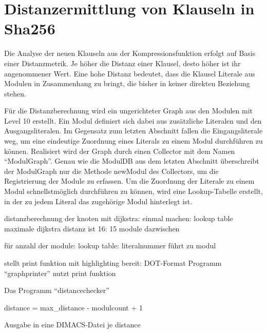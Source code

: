 \section{Distanzermittlung von Klauseln in Sha256}
\label{sec:ana:distance}

Die Analyse der neuen Klauseln aus der Kompressionsfunktion erfolgt auf Basis einer Distanzmetrik. Je höher die Distanz einer Klausel, desto höher
ist ihr angenommener Wert. Eine hohe Distanz bedeutet, dass die Klausel Literale aus Modulen in Zusammenhang zu bringt, die bisher in keiner direkten
Beziehung stehen.

Für die Distanzberechnung wird ein ungerichteter Graph aus den Modulen mit Level 10 erstellt. Ein Modul definiert sich dabei aus zusätzliche Literalen
und den Ausgangsliteralen. Im Gegensatz zum letzten Abschnitt fallen die Eingangsliterale weg, um eine eindeutige Zuordnung eines Literals zu einem
Modul durchführen zu können. Realisiert wird der Graph durch einen Collector mit dem Namen "`ModulGraph"'. Genau wie die ModulDB aus dem letzten Abschnitt
überschreibt der ModulGraph nur die Methode newModul des Collectors, um die Registrierung der Module zu erfassen. Um die Zuordnung der Literale zu einem
Modul schnellstmöglich durchführen zu können, wird eine Lookup-Tabelle erstellt, in der zu jedem Literal das zugehörige Modul hinterlegt ist.


distanzberechnung der knoten mit dijkstra: einmal machen: lookup table
maximale dijkstra distanz ist 16: 15 module dazwischen

für anzahl der module: lookup table: literalnummer führt zu modul


stellt print funktion mit highlighting bereit: DOT-Format
Programm "`graphprinter"' nutzt print funktion



Das Programm "`distancechecker"'

distance = max\_distance - modulcount + 1

Ausgabe in eine DIMACS-Datei je distance


